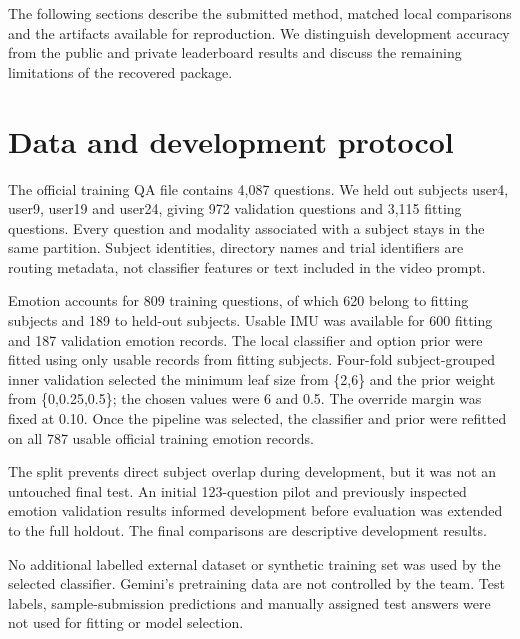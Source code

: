 \documentclass[12pt,a4paper]{article}
\begin{document}
The following sections describe the submitted method, matched local comparisons and the artifacts available for reproduction. We distinguish development accuracy from the public and private leaderboard results and discuss the remaining limitations of the recovered package.

\section{Data and development protocol}
The official training QA file contains 4,087 questions. We held out subjects user4, user9, user19 and user24, giving 972 validation questions and 3,115 fitting questions. Every question and modality associated with a subject stays in the same partition. Subject identities, directory names and trial identifiers are routing metadata, not classifier features or text included in the video prompt.

Emotion accounts for 809 training questions, of which 620 belong to fitting subjects and 189 to held-out subjects. Usable IMU was available for 600 fitting and 187 validation emotion records. The local classifier and option prior were fitted using only usable records from fitting subjects. Four-fold subject-grouped inner validation selected the minimum leaf size from \{2,6\} and the prior weight from \{0,0.25,0.5\}; the chosen values were 6 and 0.5. The override margin was fixed at 0.10. Once the pipeline was selected, the classifier and prior were refitted on all 787 usable official training emotion records.

The split prevents direct subject overlap during development, but it was not an untouched final test. An initial 123-question pilot and previously inspected emotion validation results informed development before evaluation was extended to the full holdout. The final comparisons are descriptive development results.

No additional labelled external dataset or synthetic training set was used by the selected classifier. Gemini's pretraining data are not controlled by the team. Test labels, sample-submission predictions and manually assigned test answers were not used for fitting or model selection.
\end{document}
